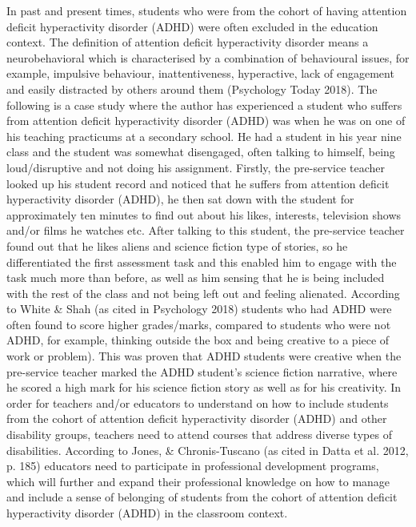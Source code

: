\documentclass[twoside,14pt,a4paper,notitlepage]{memoir}
\begin{document}
In past and present times, students who were from the cohort of having attention deficit hyperactivity disorder (ADHD) were often excluded in the education context. The definition of attention deficit hyperactivity disorder means a neurobehavioral which is characterised by a combination of behavioural issues, for example, impulsive behaviour, inattentiveness, hyperactive, lack of engagement and easily distracted by others around them (Psychology Today 2018). The following is a case study where the author has experienced a student who suffers from attention deficit hyperactivity disorder (ADHD) was when he was on one of his teaching practicums at a secondary school. He had a student in his year nine class and the student was somewhat disengaged, often talking to himself, being loud/disruptive and not doing his assignment. Firstly, the pre-service teacher looked up his student record and noticed that he suffers from attention deficit hyperactivity disorder (ADHD), he then sat down with the student for approximately ten minutes to find out about his likes, interests, television shows and/or films he watches etc. After talking to this student, the pre-service teacher found out that he likes aliens and science fiction type of stories, so he differentiated the first assessment task and this enabled him to engage with the task much more than before, as well as him sensing that he is being included with the rest of the class and not being left out and feeling alienated. According to White \& Shah (as cited in Psychology 2018) students who had ADHD were often found to score higher grades/marks, compared to students who were not ADHD, for example, thinking outside the box and being creative to a piece of work or problem). This was proven that ADHD students were creative when the pre-service teacher marked the ADHD student’s science fiction narrative, where he scored a high mark for his science fiction story as well as for his creativity.
In order for teachers and/or educators to understand on how to include students from the cohort of attention deficit hyperactivity disorder (ADHD) and other disability groups, teachers need to attend courses that address diverse types of disabilities. According to Jones, \& Chronis-Tuscano (as cited in Datta et al. 2012, p. 185) educators need to participate in professional development programs, which will further and expand their professional knowledge on how to manage and include a sense of belonging of students from the cohort of attention deficit hyperactivity disorder (ADHD) in the classroom context.
\end{document}
